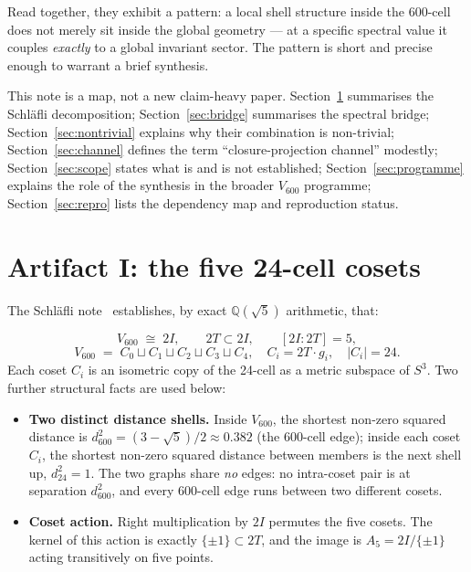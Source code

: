 \documentclass[11pt]{article}
\newcommand{\Vsix}{V_{600}}
\newcommand{\twoI}{2I}
\newcommand{\twoT}{2T}
\theoremstyle{definition}
\begin{document}
Read together, they exhibit a pattern: a local shell structure
inside the 600-cell does not merely sit inside the global geometry
--- at a specific spectral value it couples \emph{exactly} to a
global invariant sector.  The pattern is short and precise enough to
warrant a brief synthesis.

This note is a map, not a new claim-heavy paper.  Section~\ref{sec:dec}
summarises the Schl\"afli decomposition; Section~\ref{sec:bridge}
summarises the spectral bridge; Section~\ref{sec:nontrivial} explains
why their combination is non-trivial; Section~\ref{sec:channel}
defines the term ``closure-projection channel'' modestly;
Section~\ref{sec:scope} states what is and is not established;
Section~\ref{sec:programme} explains the role of the synthesis in the
broader $\Vsix$ programme; Section~\ref{sec:repro} lists the
dependency map and reproduction status.

\section{Artifact I: the five 24-cell cosets}\label{sec:dec}

The Schl\"afli note~\cite{SmartSchlafli2026} establishes, by exact
$\mathbb{Q}(\sqrt 5)$ arithmetic, that:

\[
  \Vsix \;\cong\; \twoI, \qquad \twoT \subset \twoI, \qquad
  [\twoI : \twoT] = 5,
\]
\[
  \Vsix \;=\; C_0 \sqcup C_1 \sqcup C_2 \sqcup C_3 \sqcup C_4,
  \quad C_i = \twoT\cdot g_i, \quad |C_i| = 24.
\]
Each coset $C_i$ is an isometric copy of the 24-cell as a metric
subspace of $S^3$.  Two further structural facts are used below:

\begin{itemize}
  \item \textbf{Two distinct distance shells.}  Inside $\Vsix$, the
        shortest non-zero squared distance is
        $d^2_{600} = (3 - \sqrt 5)/2 \approx 0.382$ (the 600-cell
        edge); inside each coset $C_i$, the shortest non-zero
        squared distance between members is the next shell up,
        $d^2_{24} = 1$.  The two graphs share \emph{no} edges: no
        intra-coset pair is at separation $d^2_{600}$, and every
        600-cell edge runs between two different cosets.
  \item \textbf{Coset action.}  Right multiplication by $\twoI$
        permutes the five cosets.  The kernel of this action is
        exactly $\{\pm 1\}\subset\twoT$, and the image is $A_5 =
        \twoI/\{\pm 1\}$ acting transitively on five points.
\end{itemize}
\end{document}
